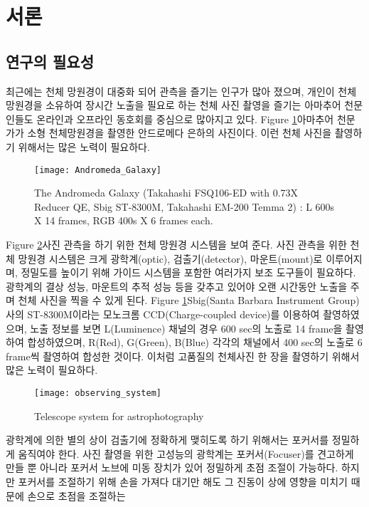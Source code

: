 \section{서론}

\subsection{연구의 필요성}

최근에는 천체 망원경이 대중화 되어 관측을 즐기는 인구가 많아 졌으며, 개인이 천체 망원경을 소유하여 장시간 노출을 필요로 하는 천체 사진 촬영을 즐기는 아마추어 천문인들도 온라인과 오프라인 동호회를 중심으로 많아지고 있다. Figure \ref{fig:The_Andromeda_Galaxy}\은 아마추어 천문가가 소형 천체망원경을 촬영한 안드로메다 은하의 사진이다. 이런 천체 사진을 촬영하기 위해서는 많은 노력이 필요하다.
\begin{figure}[h]
	\begin{center}
		\texttt{[image: Andromeda\_Galaxy]}
		\caption{The Andromeda Galaxy (Takahashi FSQ106-ED with 0.73X Reducer QE, Sbig ST-8300M, Takahashi EM-200 Temma 2) : L 600s X 14 frames, RGB 400s X 6 frames each.}
		\label{fig:The_Andromeda_Galaxy}
	\end{center}
\end{figure}

Figure \ref{fig:observing_system}\은 사진 관측을 하기 위한 천체 망원경 시스템을 보여 준다. 사진 관측을 위한 천체 망원경 시스템은 크게 광학계(optic), 검출기(detector), 마운트(mount)로 이루어지며, 정밀도를 높이기 위해 가이드 시스템을 포함한 여러가지 보조 도구들이 필요하다. 광학계의 결상 성능, 마운트의 추적 성능 등을 갖추고 있어야 오랜 시간동안 노출을 주며 천체 사진을 찍을 수 있게 된다. Figure \ref{fig:The_Andromeda_Galaxy}\은 Sbig(Santa Barbara Instrument Group)사의  ST-8300M이라는 모노크롬 CCD(Charge-coupled device)를 이용하여 촬영하였으며, 노출 정보를 보면 L(Luminence) 채널의 경우 600 sec의 노출로 14 frame을 촬영하여 합성하였으며, R(Red), G(Green), B(Blue) 각각의 채널에서 400 sec의 노출로 6 frame씩 촬영하여 합성한 것이다. 이처럼 고품질의 천체사진 한 장을 촬영하기 위해서 많은 노력이 필요하다. 

\begin{figure}[h]
\begin{center}
	\texttt{[image: observing\_system]}
	\caption{Telescope system for astrophotography}
	\label{fig:observing_system}
\end{center}
\end{figure}

광학계에 의한 별의 상이 검출기에 정확하게 맺히도록 하기 위해서는 포커서를 정밀하게 움직여야 한다. 사진 촬영을 위한 고성능의 광학계는 포커서(Focuser)를 견고하게 만들 뿐 아니라 포커서 노브에 미동 장치가 있어 정밀하게 초점 조절이 가능하다. 하지만 포커서를 조절하기 위해 손을 가져다 대기만 해도 그 진동이 상에 영향을 미치기 때문에 손으로 초점을 조절하는 

